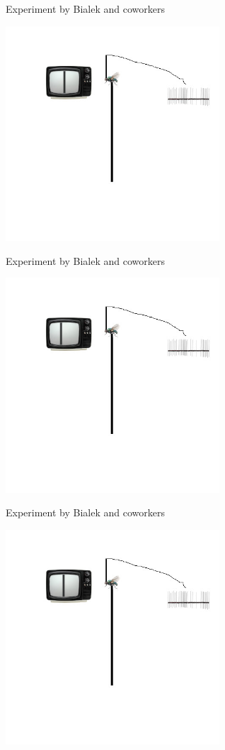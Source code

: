 \documentclass{beamer}
\begin{document}
\begin{frame}{Experiment by Bialek and coworkers}
  \begin{center}
    \includegraphics[width=8cm]{experiment4.jpg}
  \end{center}
\end{frame}

\begin{frame}{Experiment by Bialek and coworkers}
  \begin{center}
    \includegraphics[width=8cm]{experiment7.jpg}
  \end{center}
\end{frame}

\begin{frame}{Experiment by Bialek and coworkers}
  \begin{center}
    \includegraphics[width=8cm]{experiment5.jpg}
  \end{center}
\end{frame}
\end{document}
